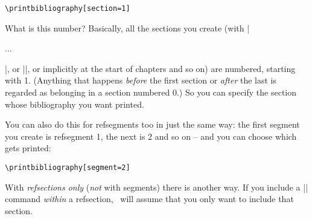 \begin{Verbatim}
\printbibliography[section=1]
\end{Verbatim}

What is this number? Basically, all the sections you create (with
|\begin{refsection}...\end{refsection}|, or |\newrefsection|, or
implicitly at the start of chapters and so on) are numbered, starting
with 1. (Anything that happens \emph{before} the first section or
\emph{after} the last is regarded as belonging in a section numbered
0.) So you can specify the section whose bibliography you want
printed.

You can also do this for refsegments too in just the same way: the
first segment you create is refsegment 1, the next is 2 and so on --
and you can choose which gets printed:

\begin{Verbatim}
\printbibliography[segment=2]
\end{Verbatim}

With \emph{refsections only} (\emph{not} with segments) there is
another way. If you include a |\printbibliography| command
\emph{within} a refsection, \biblatex\ will assume that you only want
to include that section.

